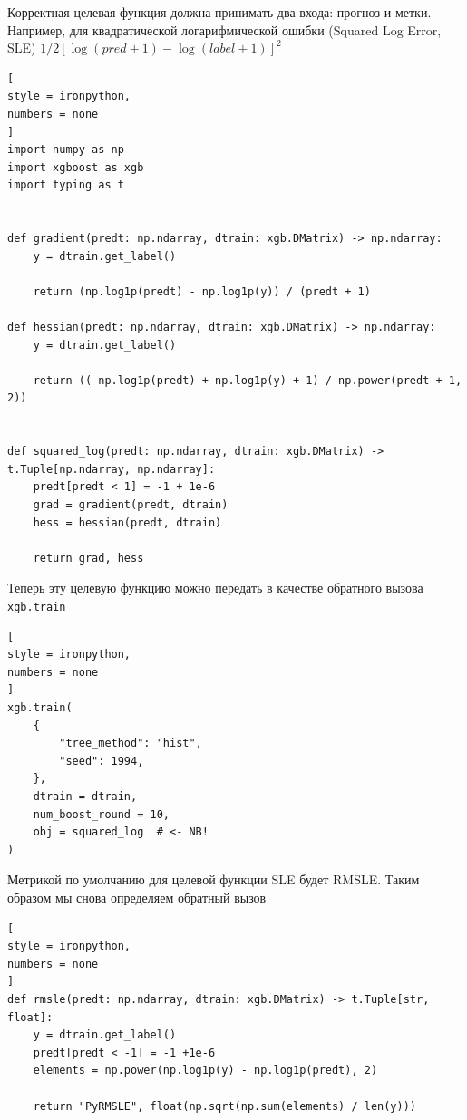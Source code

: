 \documentclass[%
	11pt,
	a4paper,
	utf8,
		]{article}
\begin{document}
Корректная целевая функция должна принимать два входа: прогноз и метки. Например, для квадратической логарифмической ошибки (Squared Log Error, SLE) $ 1 / 2 [\log (pred + 1) - \log(label +1)]^2 $
\begin{lstlisting}[
style = ironpython,
numbers = none
]
import numpy as np
import xgboost as xgb
import typing as t


def gradient(predt: np.ndarray, dtrain: xgb.DMatrix) -> np.ndarray:
	y = dtrain.get_label()

	return (np.log1p(predt) - np.log1p(y)) / (predt + 1)

def hessian(predt: np.ndarray, dtrain: xgb.DMatrix) -> np.ndarray:
	y = dtrain.get_label()

	return ((-np.log1p(predt) + np.log1p(y) + 1) / np.power(predt + 1, 2))


def squared_log(predt: np.ndarray, dtrain: xgb.DMatrix) -> t.Tuple[np.ndarray, np.ndarray]:
	predt[predt < 1] = -1 + 1e-6
	grad = gradient(predt, dtrain)
	hess = hessian(predt, dtrain)
	
	return grad, hess
\end{lstlisting}

Теперь эту целевую функцию можно передать в качестве обратного вызова \verb|xgb.train|
\begin{lstlisting}[
style = ironpython,
numbers = none
]
xgb.train(
    {
        "tree_method": "hist",
        "seed": 1994,
    },
    dtrain = dtrain,
    num_boost_round = 10,
    obj = squared_log  # <- NB!
)
\end{lstlisting}

Метрикой по умолчанию для целевой функции SLE будет RMSLE. Таким образом мы снова определяем обратный вызов
\begin{lstlisting}[
style = ironpython,
numbers = none
]
def rmsle(predt: np.ndarray, dtrain: xgb.DMatrix) -> t.Tuple[str, float]:
    y = dtrain.get_label()
    predt[predt < -1] = -1 +1e-6
    elements = np.power(np.log1p(y) - np.log1p(predt), 2)
    
    return "PyRMSLE", float(np.sqrt(np.sum(elements) / len(y)))
\end{lstlisting}
\end{document}
